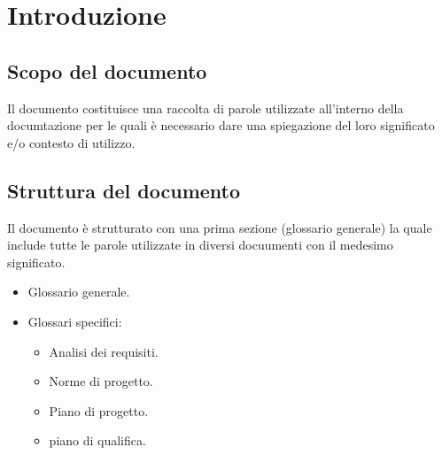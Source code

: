 \section{Introduzione}

\subsection{Scopo del documento}
Il documento costituisce una raccolta di parole utilizzate all'interno della documtazione per le quali è necessario dare una spiegazione del loro significato e/o contesto di utilizzo.

\subsection{Struttura del documento}
Il documento è strutturato con una prima sezione (glossario generale) la quale include tutte le parole utilizzate in diversi docuumenti con il medesimo significato.
\begin{itemize}
	\item Glossario generale.
	\item Glossari specifici:
	      \begin{itemize}
		      \item Analisi dei requisiti.
		      \item Norme di progetto.
		      \item Piano di progetto.
		      \item piano di qualifica.
	      \end{itemize}
\end{itemize}